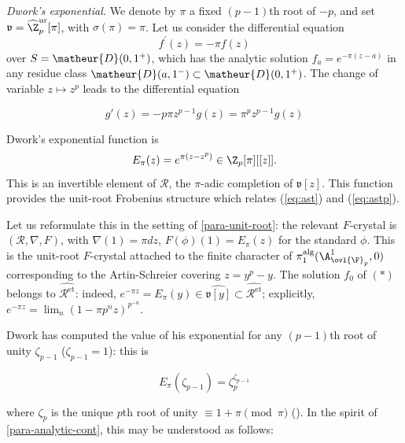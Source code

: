 \begin{exa}\label{exa-dwork-exp}
 {\itshape Dwork's exponential.} We denote by
 $\pi$ a fixed $(p-1)$th
 root of $-p$, and set $\mathfrak{v}={\widehat{\Z}}^{\mathrm{ur}}_p[\pi]$, with
 $\sigma(\pi) = \pi$. Let us
 consider the differential equation 
 \begin{equation*}\label{eq:ast}
  f^{\prime}(z)=-\pi f(z) \tag{$\ast$}
 \end{equation*}
 over $S=\matheur{D}(0,1^+)$, which has the analytic solution $f_a =
 e^{-\pi(z-a)}$ in any residue class $\matheur{D}(a,1^-)\subset
 \matheur{D}(0,1^+)$.  The change of variable $z\mapsto z^p$ leads to
 the differential equation

 \begin{equation*}\label{eq:astp}
   g'(z)=-p\pi z^{p-1}g(z) = {\pi}^p z^{p-1}g(z) \tag{$\ast_p$}
 \end{equation*} 

 \noindent
 Dwork's exponential function is 
 \begin{equation*}
  E_{\pi}(z) =
   e^{\pi(z-z^p)} \in {\Z}_p[\pi][[z]].
 \end{equation*}
 This is an invertible element of $\mathcal{R}$, the $\pi$-adic completion of
 $\mathfrak{v}[z]$. This function provides the unit-root Frobenius structure
 which relates (\ref{eq:ast}) and (\ref{eq:astp}).

 Let us reformulate this in the setting of \ref{para-unit-root}: the
 relevant $F$-crystal is $(\mathcal{R}, \nabla, F)$, with $\nabla(1) =
 \pi dz$, $F(\phi)(1) = E_{\pi}(z)$ for the standard $\phi$.  This is
 the unit-root $F$-crystal attached to the finite character of
 $\pi_1^{\mathrm{alg}}({\A}^1_{{\ovl{\F}}_p},0)$ corresponding to the
 Artin-Schreier covering $z=y^p-y.$ The solution $f_0$ of $(\ast)$
 belongs to $\widehat{\mathcal{R}^{\mathrm{et}}}$: indeed, $e^{-\pi z}=
 E_{\pi}(y) \in {\widehat{\mathfrak{v}[y]}} \subset
 \widehat{\mathcal{R}^{\mathrm{et}}}$;
 explicitly, $e^{-\pi z}=\lim_n(1-\pi p^n z)^{p^{-n}}$.

 Dwork has computed the value of his exponential for any $(p-1)$th
 root of unity $\zeta_{p-1}$ (\eg $\zeta_{p-1} =1$): this is

 \begin{equation*}
  E_{\pi}(\zeta_{p-1})=\zeta_p^{\zeta_{p-1}} 
 \end{equation*}

 where $\zeta_p$ is the unique $p$th root of unity $\equiv
 1+\pi\pmod{\pi}$ (\cf \cite[chap. 14]{cf1a2}).  In the spirit of
 \ref{para-analytic-cont}, this may be understood as follows:


\end{exa}
